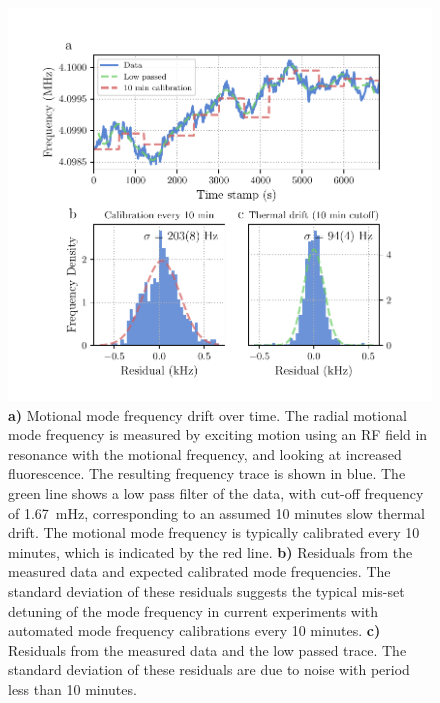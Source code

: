     \begin{figure}
        \begin{center}
        \noindent\includegraphics[width=\linewidth]{
            figures/pdf_figure/mode_drift.pdf
            }
        \end{center}
        \caption{
            \textbf{a)} Motional mode frequency drift over time. The radial motional mode frequency is measured by exciting motion using an RF field in resonance with the motional frequency, and looking at increased fluorescence. The resulting frequency trace is shown in blue. The green line shows a low pass filter of the data, with cut-off frequency of 1.67~\unit{\mHz}, corresponding to an assumed 10 minutes slow thermal drift. The motional mode frequency is typically calibrated every 10 minutes, which is indicated by the red line. 
            \textbf{b)} Residuals from the measured data and expected calibrated mode frequencies. The standard deviation of these residuals suggests the typical mis-set detuning of the mode frequency in current experiments with automated mode frequency calibrations every 10 minutes.
            \textbf{c)} Residuals from the measured data and the low passed trace. The standard deviation of these residuals are due to noise with period less than 10 minutes. 
            }
        \label{fig:mode drift}
    \end{figure}

